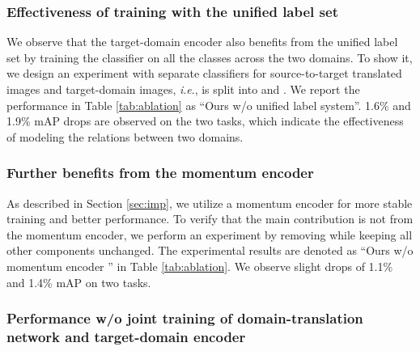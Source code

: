 \documentclass[journal]{IEEEtran}
\newcommand{\ie}{\textit{i}.\textit{e}., }
\begin{document}
\subsubsection{\textbf{Effectiveness of training with the unified label set}}
We observe that the target-domain encoder also benefits from the unified label set by training the classifier on all the  classes across the two domains.
To show it, we design an experiment with separate classifiers for source-to-target translated images and target-domain images,
\ie  is split into  and .
We report the performance in Table \ref{tab:ablation} as ``Ours w/o unified label system''.
1.6\% and 1.9\% mAP drops are observed on the two tasks, which indicate the effectiveness of modeling the relations between two domains.


\subsubsection{\textbf{Further benefits from the momentum encoder }}
As described in Section \ref{sec:imp}, we utilize a momentum encoder \cite{he2019momentum} for more stable training and better performance.
To verify that the main contribution is not from the momentum encoder,
we perform an experiment by removing   while keeping all other components unchanged.
The experimental results are denoted as ``Ours w/o momentum encoder \cite{he2019momentum}'' in Table \ref{tab:ablation}.
We observe slight drops of 1.1\% and 1.4\% mAP on two tasks.


\subsubsection{\textbf{Performance w/o joint training of domain-translation network and target-domain encoder}}
\label{sec:woj}
\end{document}
